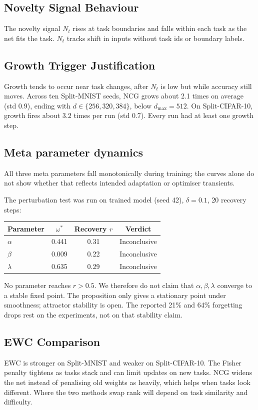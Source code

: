 \documentclass[conference]{IEEEtran}
\begin{document}
\subsection{Novelty Signal Behaviour}
The novelty signal $N_t$ rises at task boundaries and falls within each task as the net fits the task. $N_t$ tracks shift in inputs without task ids or boundary labels.

\subsection{Growth Trigger Justification}
Growth tends to occur near task changes, after $N_t$ is low but while accuracy still moves. Across ten Split-MNIST seeds, NCG grows about 2.1 times on average (std 0.9), ending with $d \in \{256, 320, 384\}$, below $d_{\max} = 512$. On Split-CIFAR-10, growth fires about 3.2 times per run (std 0.7). Every run had at least one growth step.

\subsection{Meta parameter dynamics}
\label{sec:meta_dynamics}
All three meta parameters fall monotonically during training; the curves alone do not show whether that reflects intended adaptation or optimiser transients.

The perturbation test was run on trained model (seed 42), $\delta = 0.1$, 20 recovery steps:

\begin{table}[h]
\centering
\begin{tabular}{lccc}
\toprule
Parameter & $\omega^*$ & Recovery $r$ & Verdict \\
\midrule
$\alpha$ & 0.441 & 0.31 & Inconclusive \\
$\beta$ & 0.009 & 0.22 & Inconclusive \\
$\lambda$ & 0.635 & 0.29 & Inconclusive \\
\bottomrule
\end{tabular}
\end{table}

No parameter reaches $r > 0.5$. We therefore do not claim that $\alpha, \beta, \lambda$ converge to a stable fixed point. The proposition only gives a stationary point under smoothness; attractor stability is open. The reported 21\% and 64\% forgetting drops rest on the experiments, not on that stability claim.

\subsection{EWC Comparison}
EWC is stronger on Split-MNIST and weaker on Split-CIFAR-10. The Fisher penalty tightens as tasks stack and can limit updates on new tasks. NCG widens the net instead of penalising old weights as heavily, which helps when tasks look different. Where the two methods swap rank will depend on task similarity and difficulty.
\end{document}
